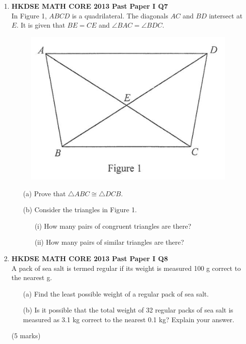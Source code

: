 \documentclass[12pt]{article}
\begin{document}
\begin{enumerate}
	\item \textbf{HKDSE MATH CORE 2013 Past Paper I Q7}\\
	In Figure 1, $ABCD$ is a quadrilateral. The diagonals $AC$ and $BD$ intersect at $E$. It is given that $BE = CE$ and $\angle BAC = \angle BDC$.
	\begin{figure}[H]
		\centering
		\includegraphics[width = .3\linewidth]{2013Figure1.1}
	\end{figure}
	\begin{enumerate}
		\item[(a)] Prove that $\triangle ABC \cong \triangle DCB$.
		\item[(b)] Consider the triangles in Figure 1.
		\begin{enumerate}
			\item[(i)] How many pairs of congruent triangles are there?
			\item[(ii)] How many pairs of similar triangles are there?	
		\end{enumerate}
	\end{enumerate}
	
	\item \textbf{HKDSE MATH CORE 2013 Past Paper I Q8}\\
	A pack of sea salt is termed regular if its weight is measured 100 g correct to the nearest g.
	\begin{enumerate}
		\item[(a)] Find the least possible weight of a regular pack of sea salt.
		\item[(b)] Is it possible that the total weight of 32 regular packs of sea salt is measured as 3.1 kg correct to the nearest 0.1 kg? Explain your answer.	
	\end{enumerate}
	(5 marks)


\end{enumerate}
\end{document}
